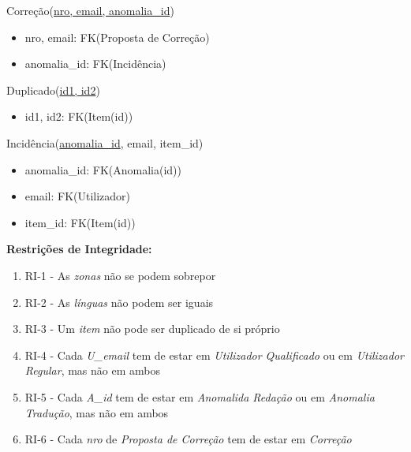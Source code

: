 \documentclass[12pt]{report}
\begin{document}
\begin{multicols}{2}
\vspace{5mm}

Correção(\underline{nro, email, anomalia\_id})
\begin{itemize}
	\item nro, email: FK(Proposta de Correção)
	\item anomalia\_id: FK(Incidência)
\end{itemize}



Duplicado(\underline{id1, id2})
    \begin{itemize}
	    \item id1, id2: FK(Item(id))
    \end{itemize}


\vspace{5mm}

Incidência(\underline{anomalia\_id}, email, item\_id)
    \begin{itemize}
	    \item anomalia\_id: FK(Anomalia(id))
	    \item email: FK(Utilizador)
	    \item item\_id: FK(Item(id))
    \end{itemize}


\vspace{5mm}

\end{multicols}

\Large
\textbf{Restrições de Integridade: }\\

\normalsize
\begin{enumerate}
    \item RI-1 - As \textit{zonas} não se podem sobrepor
    \item RI-2 - As \textit{línguas} não podem ser iguais
    \item RI-3 - Um \textit{item} não pode ser duplicado de si próprio
    \item RI-4 - Cada \textit{U\_email} tem de estar em \textit{Utilizador Qualificado} ou em \textit{Utilizador Regular}, mas não em ambos
    \item RI-5 - Cada \textit{A\_id} tem de estar em \textit{Anomalida Redação} ou em \textit{Anomalia Tradução}, mas não em ambos
    \item RI-6 - Cada \textit{nro} de \textit{Proposta de Correção} tem de estar em \textit{Correção}
    
\end{enumerate}
\end{document}
